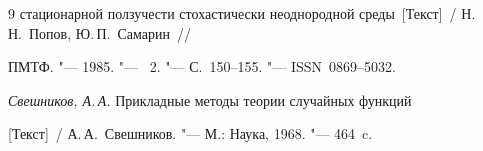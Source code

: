 \begin{thebibliography}{9}
  стационарной ползучести стохастически неоднородной среды~[Текст]~/ Н.\,Н.~Попов,  Ю.\,П.~Самарин~/\!/

  ПМТФ. "--- 1985. "--- \No~2. "--- С.~150--155. "--- ISSN~0869--5032.



 \textit{Свешников, А.\,А.} Прикладные методы теории случайных функций

  [Текст]~/ А.\,А.~Свешников. "--- М.: Наука, 1968. "--- 464~c.































\end{thebibliography}
